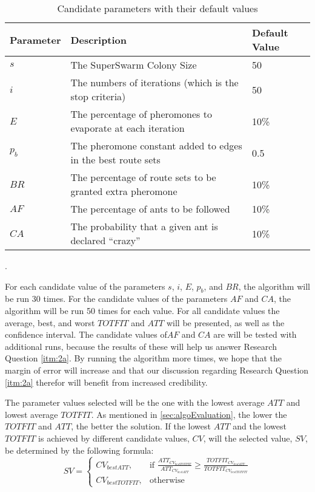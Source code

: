 \begin{table}[H]
	\small
	\begin{tabular}{|l|l|l|}
    	\hline
    	Parameter & Description & Default Value\\
    	\hline
    	$s$ & The SuperSwarm Colony Size & 50\\
    	$i$ & The numbers of iterations (which is the stop criteria) & 50\\
    	$E$ & The percentage of pheromones to evaporate at each iteration & 10\%\\
    	$p_b$ & The pheromone constant added to edges in the best route sets & 0.5\\
    	$BR$ & The percentage of route sets to be granted extra pheromone & 10\%\\
    	$AF$ & The percentage of ants to be followed & 10\%\\
    	$CA$ & The probability that a given ant is declared ``crazy'' & 10\%\\
   	    \hline
    \end{tabular}
    \caption {Candidate parameters with their default values}.
    \label{table:parameters}
\end{table}

For each candidate value of the parameters $s$, $i$, $E$, $p_b$, and $BR$, the algorithm will be run 30 times. For the candidate values of the parameters $AF$ and $CA$, the algorithm will be run 50 times for each value. For all candidate values the average, best, and worst $TOTFIT$ and $ATT$ will be presented, as well as the confidence interval. The candidate values of$AF$ and $CA$ are will be tested with additional runs, because the results of these will help us answer Research Question \vref{itm:2a}. By running the algorithm more times, we hope that the margin of error will increase and that our discussion regarding Research Question \vref{itm:2a} therefor will benefit from increased credibility.

The parameter values selected will be the one with the lowest average $ATT$ and lowest average $TOTFIT$. As mentioned in \vref{sec:algoEvaluation}, the lower the $TOTFIT$ and $ATT$, the better the solution. If the lowest $ATT$ and the lowest$TOTFIT$ is achieved by different candidate values, $CV$, will the selected value, $SV$, be determined by the following formula:
\[
    SV= 
\begin{cases}
    CV_{bestATT},& \text{if } \frac{ATT_{CV_{bestTOTFIT}}}{ATT_{CV_{bestATT}}}\geq \frac{TOTFIT_{CV_{bestATT}}}{TOTFIT_{CV_{bestTOTFIT}}}\\
    CV_{bestTOTFIT},& \text{otherwise}
\end{cases}
\]


